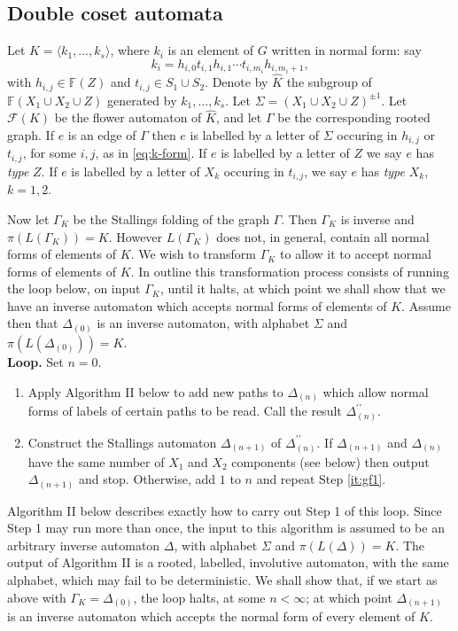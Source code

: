 \documentclass[a4paper,12pt]{article}
\newcommand{\G}{\Gamma }
\newcommand{\D}{\Delta }
\renewcommand{\S}{\Sigma }
\newcommand{\cF}{{\cal{F}}}
\numberwithin{equation}{section}
\numberwithin{figure}{section}
\newcommand{\FF}{\ensuremath{\mathbb{F}}}
\renewcommand{\cF}{\mathcal{F}}
\newcommand{\la}{\langle}
\newcommand{\ra}{\rangle}
\newcommand{\be}{\begin{enumerate}}
\newcommand{\ee}{\end{enumerate}}
\begin{document}
\subsection{Double coset automata}\label{sec:dca}
%
%
Let $K=\la k_1, \ldots , k_s\ra$, where $k_i$ is an element of $G$
written in normal form: say
\begin{equation}\label{eq:k-form}
k_i= h_{i,0}t_{i,1}h_{i,1}\cdots t_{i,m_i}h_{i,m_i+1},
\end{equation}
with $h_{i,j}\in \FF(Z)$ and $t_{i,j}\in S_1\cup S_2$. Denote
by $\hat K$ the subgroup of  $\FF(X_1\cup X_2 \cup Z)$ generated by
$k_1, \ldots , k_s$. Let $\S=(X_1\cup X_2 \cup Z)^{\pm 1}$.
Let $\cF(K)$ be the flower automaton of $\hat K$, and let
$\G$ be the corresponding rooted graph. If $e$ is an edge of $\G$ then
$e$ is labelled by a letter of $\S$
occuring in $h_{i,j}$ or $t_{i,j}$, for some $i,j$, as in
\eqref{eq:k-form}. If $e$ is labelled by a letter of $Z$ we say $e$ has {\em type} $Z$.
If $e$ is labelled by a letter of $X_k$ occuring in $t_{i,j}$, we
say $e$ has {\em type} $X_k$, $k = 1,2$.

Now let $\G_K$ be the Stallings folding of the graph $\G$.  Then
 $\G_K$ is inverse and $\pi(L(\G_K))=K$. However
$L(\G_K)$ does not, in general, contain all normal forms of elements of $K$.
We wish to transform $\G_K$ to allow it to accept normal forms of
elements of $K$. In outline this transformation process consists of
running the loop below, on input $\G_K$,
until it halts, at which point we shall show that we have an
inverse automaton which accepts  normal forms of elements of $K$.
Assume then that $\D_{(0)}$ is an inverse automaton, with alphabet $\S$
and $\pi(L(\D_{(0)}))=K$. \\[1em]
\textbf{Loop.}
Set $n=0$.
\be[Step 1.]
\item\label{it:gf1} Apply Algorithm II below to add new paths to $\D_{(n)}$ which allow normal forms of labels
of certain paths to be read. %
Call the result $\D_{(n)}^{\prime\prime}$.
\item\label{it:gf2} Construct the Stallings automaton $\D_{(n+1)}$
of $\D_{(n)}^{\prime\prime}$. If $\D_{(n+1)}$ and
$\D_{(n)}$ have the same
 number of
$X_1$ and $X_2$ components (see below) then output $\D_{(n+1)}$
and stop. Otherwise, add $1$ to $n$ and  repeat Step \ref{it:gf1}.
\ee

Algorithm II below describes exactly how to carry out Step 1 of
this loop. Since Step 1 may run more than once,  the input to this
algorithm is assumed to be an arbitrary inverse automaton $\D$,
with alphabet $\S$ and $\pi(L(\D))=K$. The output of Algorithm II
is a rooted,
labelled, involutive automaton, with the same alphabet, which may
fail to be deterministic. We shall show that, if we start as above
with $\G_K=\D_{(0)}$,  the loop halts, at some $n<\infty$; at
which point $\D_{(n+1)}$ is an inverse automaton which accepts the
normal form of every element of $K$. \\[1em]
\end{document}

